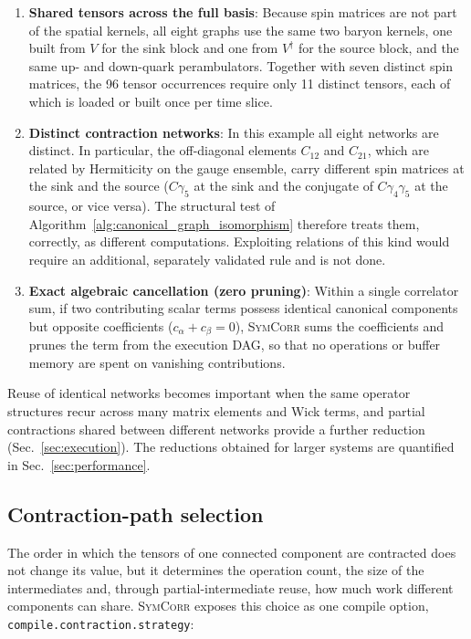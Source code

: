 \documentclass[a4paper,fleqn]{cas-dc}
\begin{document}
\begin{enumerate}
    \item \textbf{Shared tensors across the full basis}:
    Because spin matrices are not part of the spatial kernels, all eight graphs use the same two baryon
    kernels, one built from $V$ for the sink block and one from $V^\dagger$ for the source block, and the
    same up- and down-quark perambulators. Together with seven distinct spin matrices, the 96 tensor
    occurrences require only 11 distinct tensors, each of which is loaded or built once per time slice.

    \item \textbf{Distinct contraction networks}:
    In this example all eight networks are distinct. In particular, the off-diagonal elements
    \(C_{12}\) and \(C_{21}\), which are related by Hermiticity on the gauge ensemble, carry different
    spin matrices at the sink and the source (\(C\gamma_5\) at the sink and the conjugate of
    \(C\gamma_4\gamma_5\) at the source, or vice versa). The structural test of
    Algorithm~\ref{alg:canonical_graph_isomorphism} therefore treats them, correctly, as different
    computations. Exploiting relations of this kind would require an additional, separately validated
    rule and is not done.

    \item \textbf{Exact algebraic cancellation (zero pruning)}:
    Within a single correlator sum, if two contributing scalar terms possess identical canonical components but opposite coefficients (\(c_\alpha + c_\beta = 0\)), \textsc{SymCorr} sums the coefficients and prunes the term from the execution DAG, so that no operations or buffer memory are spent on vanishing contributions.
\end{enumerate}

Reuse of identical networks becomes important when the same operator structures recur across many
matrix elements and Wick terms, and partial contractions shared between different networks provide a
further reduction (Sec.~\ref{sec:execution}). The reductions obtained for larger systems are
quantified in Sec.~\ref{sec:performance}.

\sloppy
\subsection{Contraction-path selection}
\label{sec:contraction_paths}

The order in which the tensors of one connected component are contracted does
not change its value, but it determines the operation count, the size of the
intermediates and, through partial-intermediate reuse, how much work different
components can share. \textsc{SymCorr} exposes this choice as one compile option,
\texttt{compile.contraction.strategy}:
\end{document}
